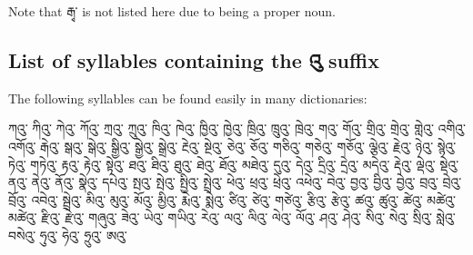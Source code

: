 \documentclass[%
a4paper,%
pagesize,%
12pt,%
parskip=off,%
bibliography=totoc,%
numbers=noenddot,%
DIV=12,%
twoside=semi,%
headings=normal%
]{scrartcl}
\begin{document}
Note that རྒྭ་ is not listed here due to being a proper noun.

\subsection{List of syllables containing the འུ suffix}

The following syllables can be found easily in many dictionaries:

ཀའུ་ ཀིའུ་ ཀེའུ་ ཀོའུ་ ཀྲའུ་ ཀྲུའུ་ ཁིའུ་ ཁེའུ་ ཁྱིའུ་ ཁྱེའུ་ ཁྲིའུ་ ཁྲུའུ་ ཁྲེའུ་ གའུ་ གོའུ་ གྲིའུ་ གྲེའུ་ གླེའུ་ འགིའུ་ འགོའུ་ རྒེའུ་ སྒའུ་ སྒེའུ་ སྒྱིའུ་ སྒྱེའུ་ སྒྲེའུ་ རྔེའུ་ སྔེའུ་ ཅེའུ་ ཅོའུ་ གཅིའུ་ གཅེའུ་ གཅོའུ་ ལྕེའུ་ རྗེའུ་ ཉེའུ་ སྙེའུ་ ཏེའུ་ གཏེའུ་ རྟའུ་ རྟེའུ་ སྟེའུ་ ཐའུ་ ཐིའུ་ ཐུའུ་ ཐེའུ་ ཐོའུ་ མཐེའུ་ དུའུ་ དེའུ་ དྲིའུ་ དྲེའུ་ མདེའུ་ རྡེའུ་ ལྡེའུ་ སྡེའུ་ ནའུ་ ནེའུ་ ནོའུ་ སྣེའུ་ དཔེའུ་ སྤའུ་ སྤེའུ་ སྤྱིའུ་ སྤྲེའུ་ ཕེའུ་ ཕྲའུ་ ཕྲེའུ་ འཕེའུ་ བེའུ་ བྱའུ་ བྱིའུ་ བྱེའུ་ བྲའུ་ བྲེའུ་ བྲོའུ་ འབེའུ་ སྦྲེའུ་ མིའུ་ མུའུ་ མོའུ་ མྱིའུ་ རྨེའུ་ སྨེའུ་ ཙིའུ་ ཙེའུ་ གཙེའུ་ རྩིའུ་ རྩེའུ་ ཚའུ་ ཚུའུ་ ཚེའུ་ མཚེའུ་ མཚེའུ་ རྫིའུ་ རྫེའུ་ གཞུའུ་ ཟེའུ་ ཡེའུ་ གཡིའུ་ རེའུ་ ལའུ་ ལིའུ་ ལེའུ་ ལོའུ་ ཤའུ་ ཤེའུ་ སིའུ་ སེའུ་ སྲིའུ་ སླེའུ་ བསེའུ་ ཧུའུ་ ཧེའུ་ ཧྲུའུ་ ཨའུ་



\end{document}
